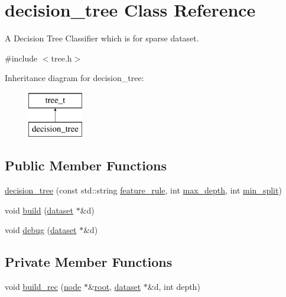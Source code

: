 \hypertarget{classdecision__tree}{\section{decision\+\_\+tree Class Reference}
\label{classdecision__tree}
}


A Decision Tree Classifier which is for sparse dataset.  




{\ttfamily \#include $<$tree.\+h$>$}

Inheritance diagram for decision\+\_\+tree\+:\begin{figure}[H]
\begin{center}
\leavevmode
\includegraphics[height=2.000000cm]{classdecision__tree}
\end{center}
\end{figure}
\subsection*{Public Member Functions}
\begin{DoxyCompactItemize}
\item 
\hyperlink{classdecision__tree_ac90ebb549d50e49ec8322d6ee8335eb8}{decision\+\_\+tree} (const std\+::string \hyperlink{classtree_a5aba3b77a347165517a20d5fab94382d}{feature\+\_\+rule}, int \hyperlink{classtree_a0a9f968fac827d3239be67488c34fb21}{max\+\_\+depth}, int \hyperlink{classtree_ae70cd626c0b50a0b8306a94a9e5e8fd7}{min\+\_\+split})
\item 
void \hyperlink{classdecision__tree_ad3286ad0d5361f3f19ddac966477b14a}{build} (\hyperlink{classdataset}{dataset} $\ast$\&d)
\item 
void \hyperlink{classdecision__tree_a738fa3b8ccbb86fea50d93acab273bde}{debug} (\hyperlink{classdataset}{dataset} $\ast$\&d)
\end{DoxyCompactItemize}
\subsection*{Private Member Functions}
\begin{DoxyCompactItemize}
\item 
void \hyperlink{classdecision__tree_affee9d32ce17c6102083d809da55a847}{build\+\_\+rec} (\hyperlink{classnode}{node} $\ast$\&\hyperlink{classtree_ad397d4906e47149b98f769b3e81473ee}{root}, \hyperlink{classdataset}{dataset} $\ast$\&d, int depth)
\end{DoxyCompactItemize}
